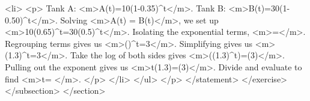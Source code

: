                         <li>
                            <p>
                                Tank A: <m>A(t)=10(1-0.35)^{t}</m>.
                                Tank B: <m>B(t)=30(1-0.50)^{t}</m>.
                                Solving <m>A(t) = B(t)</m>, we set up <m>10(0.65)^{t}=30(0.5)^{t}</m>.
                                Isolating the exponential terms, <m>=</m>.
                                Regrouping terms gives us <m>()^{t}=3</m>.
                                Simplifying gives us <m>(1.3)^{t}=3</m>.
                                Take the log of both sides gives <m>\log((1.3)^{t})=\log(3)</m>.
                                Pulling out the exponent gives us <m>t\log(1.3)=\log⁡(3)</m>.
                                Divide and evaluate to find <m>t= </m>.
                            </p>
                        </li>
                    </ul>
                </p>
            </statement>
        </exercise>
    </subsection>
</section>